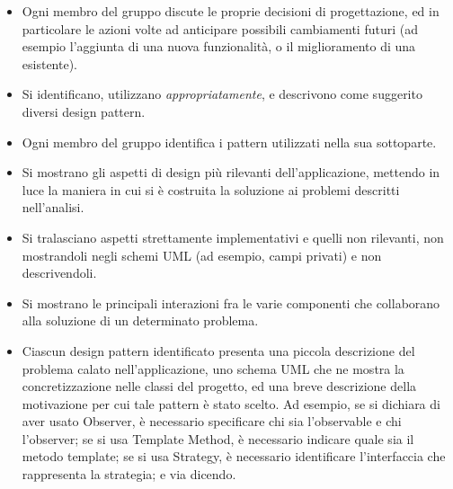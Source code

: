 \documentclass[a4paper,12pt]{report}
\begin{document}
\begin{itemize}
	\item Ogni membro del gruppo discute le proprie decisioni di progettazione, ed in particolare le azioni volte ad anticipare possibili cambiamenti futuri (ad esempio l'aggiunta di una nuova funzionalità, o il miglioramento di una esistente).
	\item Si identificano, utilizzano \textit{appropriatamente}, e descrivono come suggerito diversi design pattern.
	\item Ogni membro del gruppo identifica i pattern utilizzati nella sua sottoparte.
	\item Si mostrano gli aspetti di design più rilevanti dell'applicazione, mettendo in luce la maniera in cui si è costruita la soluzione ai problemi descritti nell'analisi.
	\item Si tralasciano aspetti strettamente implementativi e quelli non rilevanti, non mostrandoli negli schemi UML (ad esempio, campi privati) e non descrivendoli.
	\item Si mostrano le principali interazioni fra le varie componenti che collaborano alla soluzione di un determinato problema.
	\item Ciascun design pattern identificato presenta una piccola descrizione del problema calato
nell'applicazione, uno schema UML che ne mostra la concretizzazione nelle classi del progetto, ed
una breve descrizione della motivazione per cui tale pattern è stato scelto. Ad esempio, se si
dichiara di aver usato Observer, è necessario specificare chi sia l'observable e chi l'observer; se
si usa Template Method, è necessario indicare quale sia il metodo template; se si usa Strategy, è
necessario identificare l'interfaccia che rappresenta la strategia; e via dicendo.
\end{itemize}
\end{document}
